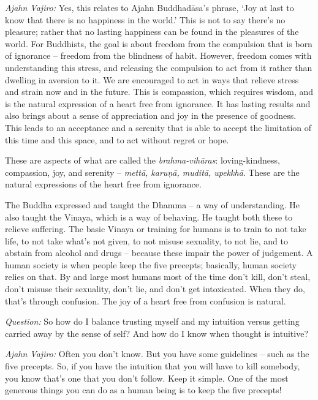 \emph{Ajahn Vajiro:} Yes, this relates to Ajahn Buddhadāsa's phrase, `Joy at last to
know that there is no happiness in the world.' This is not to say there's no
pleasure; rather that no lasting happiness can be found in the pleasures of the world. For
Buddhists, the goal is about freedom from the compulsion that is born of
ignorance -- freedom from the blindness of habit. However, freedom comes with
understanding this stress, and releasing the compulsion to act from it rather
than dwelling in aversion to it. We are encouraged to act in ways that relieve
stress and strain now and in the future. This is compassion, which requires
wisdom, and is the natural expression of a heart free from ignorance. It has
lasting results and also brings about a sense of appreciation and joy in the
presence of goodness. This leads to an acceptance and a serenity that is able to
accept the limitation of this time and this space, and to act without regret or
hope.

These are aspects of what are called the \emph{brahma-vihāras}: loving-kindness,
compassion, joy, and serenity -- \emph{mettā, karuṇā, muditā, upekkhā}. These
are the natural expressions of the heart free from ignorance.

The Buddha expressed and taught the Dhamma -- a way of understanding. He also
taught the Vinaya, which is a way of behaving. He taught both these to relieve
suffering. The basic Vinaya or training for humans is to train to not take life, to not take
what's not given, to not misuse sexuality, to not lie, and to abstain
from alcohol and drugs -- because these impair the power of judgement. A human
society is when people keep the five precepts; basically, human society relies
on that. By and large most humans most of the time don't kill, don't steal, don't misuse their
sexuality, don't lie, and don't get intoxicated. When they do, that's through
confusion. The joy of a heart free from confusion is natural.

\enlargethispage{\baselineskip}

\bigskip

\emph{Question:} So how do I balance trusting myself and my intuition versus getting
carried away by the sense of self? And how do I know when thought is intuitive?

\emph{Ajahn Vajiro:} Often you don't know. But you have some guidelines -- such as the
five precepts. So, if you have the intuition that you will have to kill
somebody, you know that's one that you don't follow. Keep it simple. One of the
most generous things you can do as a human being is to keep the five precepts!

